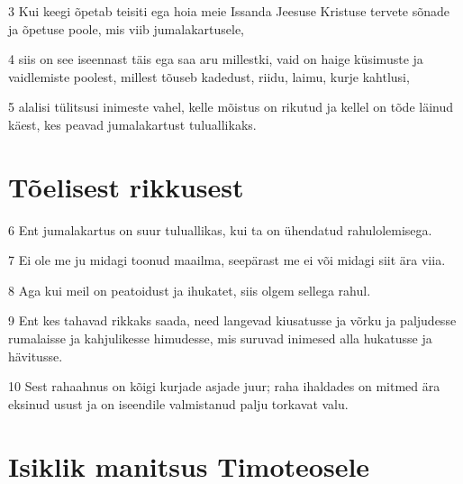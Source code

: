 \par 3 Kui keegi õpetab teisiti ega hoia meie Issanda Jeesuse Kristuse tervete sõnade ja õpetuse poole, mis viib jumalakartusele,
\par 4 siis on see iseennast täis ega saa aru millestki, vaid on haige küsimuste ja vaidlemiste poolest, millest tõuseb kadedust, riidu, laimu, kurje kahtlusi,
\par 5 alalisi tülitsusi inimeste vahel, kelle mõistus on rikutud ja kellel on tõde läinud käest, kes peavad jumalakartust tuluallikaks.
\section*{Tõelisest rikkusest}

\par 6 Ent jumalakartus on suur tuluallikas, kui ta on ühendatud rahulolemisega.
\par 7 Ei ole me ju midagi toonud maailma, seepärast me ei või midagi siit ära viia.
\par 8 Aga kui meil on peatoidust ja ihukatet, siis olgem sellega rahul.
\par 9 Ent kes tahavad rikkaks saada, need langevad kiusatusse ja võrku ja paljudesse rumalaisse ja kahjulikesse himudesse, mis suruvad inimesed alla hukatusse ja hävitusse.
\par 10 Sest rahaahnus on kõigi kurjade asjade juur; raha ihaldades on mitmed ära eksinud usust ja on iseendile valmistanud palju torkavat valu.

\section*{Isiklik manitsus Timoteosele}

